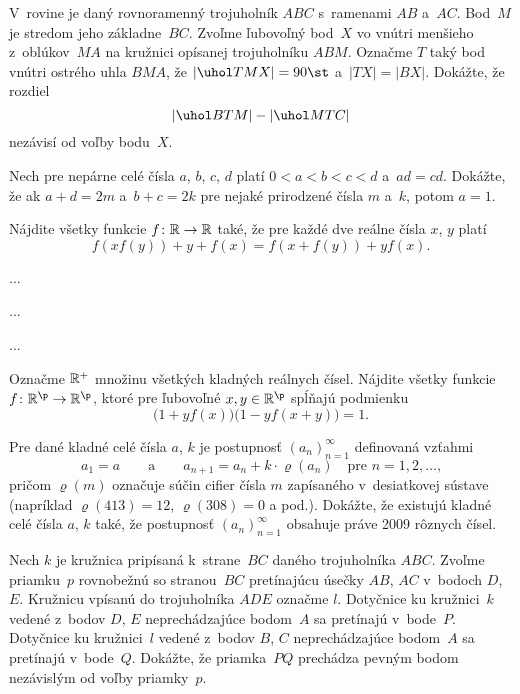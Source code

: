 {%
V~rovine je daný rovnoramenný trojuholník $ABC$ s~ramenami $AB$ a~$AC$. Bod~$M$ je stredom jeho základne~$BC$. Zvoľme ľubovoľný bod~$X$ vo vnútri menšieho z~oblúkov~$MA$ na kružnici opísanej trojuholníku $ABM$. Označme $T$ taký bod vnútri ostrého uhla $BMA$, že $|\uhol TMX|=90\st$ a~$|TX|=|BX|$. Dokážte, že rozdiel
$$
|\uhol BTM|-|\uhol MTC|
$$
nezávisí od voľby bodu~$X$.}

{%
Nech pre nepárne celé čísla $a$, $b$, $c$, $d$ platí $0 < a < b < c < d$ a~$ad = cd$.
Dokážte, že ak $a + d = 2m$ a~$b + c = 2k$ pre nejaké prirodzené čísla $m$ a~$k$,
potom $a = 1$.}

{%
Nájdite všetky funkcie $f\colon\Bbb R\to\Bbb R$ také, že pre každé dve reálne čísla $x$, $y$
platí
$$
f(xf(y)) + y + f(x) = f (x+f(y)) + yf(x).
$$}

{%
...}

{%
...}

{%
...}

{%
Označme $\Bbb R^+$ množinu všetkých kladných reálnych čísel. Nájdite všetky funkcie $f\colon\Bbb R^{\p}\to \Bbb R^{\p}$, ktoré pre ľubovoľné $x,y\in\Bbb R^{\p}$ spĺňajú podmienku
$$
\bigl(1+yf(x)\bigr)\bigl(1-yf(x+y)\bigr)=1.
$$}

{%
Pre dané kladné celé čísla $a$, $k$ je postupnosť $(a_n)_{n=1}^\infty$ definovaná vzťahmi
$$
a_1=a \qquad\text{a}\qquad a_{n+1}=a_n+k\cdot \varrho(a_n)\quad\text{pre $n=1,2,\dots$,}
$$
pričom $\varrho(m)$ označuje súčin cifier čísla $m$ zapísaného v~desiatkovej sústave (napríklad $\varrho(413)=12$, $\varrho(308)=0$ a pod.). Dokážte, že existujú kladné celé čísla $a$, $k$ také, že postupnosť $(a_n)_{n=1}^\infty$ obsahuje práve 2009 rôznych čísel.}

{%
Nech $k$ je kružnica pripísaná k~strane~$BC$ daného trojuholníka $ABC$. Zvoľme priamku~$p$ rovnobežnú so stranou~$BC$ pretínajúcu úsečky $AB$, $AC$ v~bodoch $D$, $E$. Kružnicu vpísanú do trojuholníka $ADE$ označme $l$.
Dotyčnice ku kružnici~$k$ vedené z~bodov $D$, $E$ neprechádzajúce bodom~$A$ sa pretínajú v~bode~$P$. Dotyčnice ku kružnici~$l$ vedené z~bodov $B$, $C$ neprechádzajúce bodom~$A$ sa pretínajú v~bode~$Q$. Dokážte, že priamka~$PQ$ prechádza pevným bodom nezávislým od voľby priamky~$p$.}

